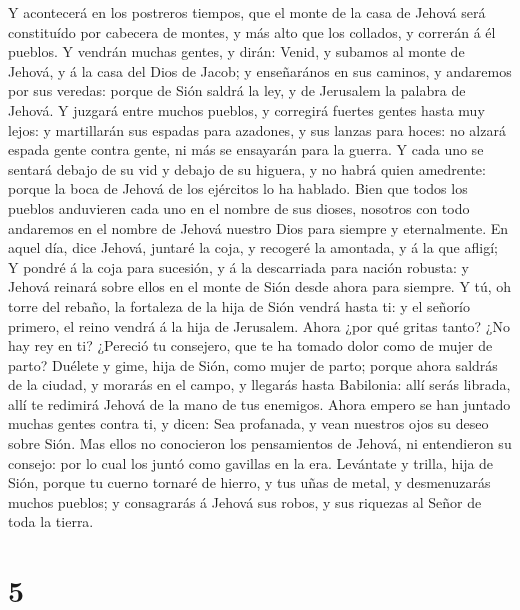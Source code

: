  Y acontecerá en los postreros tiempos, que el monte de la
casa de Jehová será constituído por cabecera de montes, y más alto que
los collados, y correrán á él pueblos.  Y vendrán muchas
gentes, y dirán: Venid, y subamos al monte de Jehová, y á la casa del
Dios de Jacob; y enseñarános en sus caminos, y andaremos por sus
veredas: porque de Sión saldrá la ley, y de Jerusalem la palabra de
Jehová.  Y juzgará entre muchos pueblos, y corregirá fuertes
gentes hasta muy lejos: y martillarán sus espadas para azadones, y sus
lanzas para hoces: no alzará espada gente contra gente, ni más se
ensayarán para la guerra.  Y cada uno se sentará debajo de
su vid y debajo de su higuera, y no habrá quien amedrente: porque la
boca de Jehová de los ejércitos lo ha hablado.  Bien que
todos los pueblos anduvieren cada uno en el nombre de sus dioses,
nosotros con todo andaremos en el nombre de Jehová nuestro Dios para
siempre y eternalmente.  En aquel día, dice Jehová, juntaré
la coja, y recogeré la amontada, y á la que afligí;  Y
pondré á la coja para sucesión, y á la descarriada para nación robusta:
y Jehová reinará sobre ellos en el monte de Sión desde ahora para
siempre.  Y tú, oh torre del rebaño, la fortaleza de la hija
de Sión vendrá hasta ti: y el señorío primero, el reino vendrá á la hija
de Jerusalem.  Ahora ¿por qué gritas tanto? ¿No hay rey en
ti? ¿Pereció tu consejero, que te ha tomado dolor como de mujer de
parto?  Duélete y gime, hija de Sión, como mujer de parto;
porque ahora saldrás de la ciudad, y morarás en el campo, y llegarás
hasta Babilonia: allí serás librada, allí te redimirá Jehová de la mano
de tus enemigos.  Ahora empero se han juntado muchas gentes
contra ti, y dicen: Sea profanada, y vean nuestros ojos su deseo sobre
Sión.  Mas ellos no conocieron los pensamientos de Jehová,
ni entendieron su consejo: por lo cual los juntó como gavillas en la
era.  Levántate y trilla, hija de Sión, porque tu cuerno
tornaré de hierro, y tus uñas de metal, y desmenuzarás muchos pueblos; y
consagrarás á Jehová sus robos, y sus riquezas al Señor de toda la
tierra.

\hypertarget{section-4}{%
\section{5}\label{section-4}}

